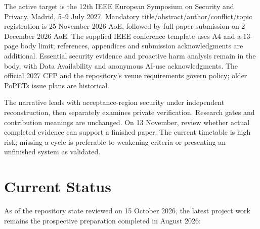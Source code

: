 \documentclass[11pt,a4paper]{article}
\begin{document}
The active target is the 12th IEEE European Symposium on Security and Privacy, Madrid, 5--9 July 2027. Mandatory title/abstract/author/conflict/topic registration is 25 November 2026 AoE, followed by full-paper submission on 2 December 2026 AoE. The supplied IEEE conference template uses A4 and a 13-page body limit; references, appendices and submission acknowledgments are additional. Essential security evidence and proactive harm analysis remain in the body, with Data Availability and anonymous AI-use acknowledgments. The official 2027 CFP and the repository's venue requirements govern policy; older PoPETs issue plans are historical.

The narrative leads with acceptance-region security under independent reconstruction, then separately examines private verification. Research gates and contribution meanings are unchanged. On 13 November, review whether actual completed evidence can support a finished paper. The current timetable is high risk; missing a cycle is preferable to weakening criteria or presenting an unfinished system as validated.

\section{Current Status}

As of the repository state reviewed on 15 October 2026, the latest project work remains the prospective preparation completed in August 2026:
\end{document}
